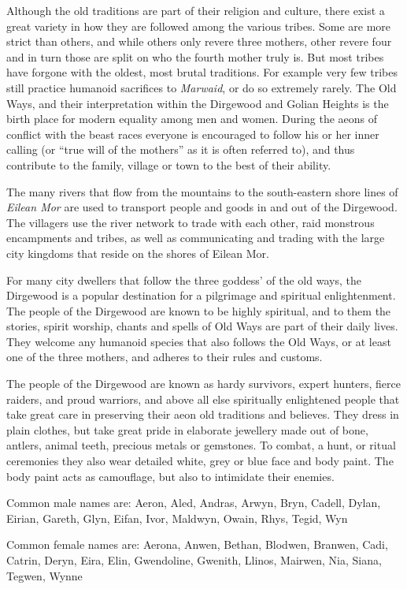 Although the old traditions are part of their religion and culture, there
exist a great variety in how they are followed among the various tribes. Some
are more strict than others, and while others only revere three mothers, other
revere four and in turn those are split on who the fourth mother truly is. But
most tribes have forgone with the oldest, most brutal traditions. For example
very few tribes still practice humanoid sacrifices to \emph{Marwaid}, or do so
extremely rarely. The Old Ways, and their interpretation within the Dirgewood
and Golian Heights is the birth place for modern equality among men and
women. During the aeons of conflict with the beast races everyone is
encouraged to follow his or her inner calling (or ``true will of the mothers''
as it is often referred to), and thus contribute to the family, village or
town to the best of their ability.

The many rivers that flow from the mountains to the south-eastern shore lines of
\emph{Eilean Mor} are used to transport people and goods in and out of the
Dirgewood. The villagers use the river network to trade with each other, raid
monstrous encampments and tribes, as well as communicating and trading with
the large city kingdoms that reside on the shores of Eilean Mor.

For many city dwellers that follow the three goddess' of the old ways, the
Dirgewood is a popular destination for a pilgrimage and spiritual
enlightenment. The people of the Dirgewood are known to be highly spiritual,
and to them the stories, spirit worship, chants and spells of Old Ways are
part of their daily lives. They welcome any humanoid species that also follows
the Old Ways, or at least one of the three mothers, and adheres to their rules
and customs.

The people of the Dirgewood are known as hardy survivors, expert hunters,
fierce raiders, and proud warriors, and above all else spiritually enlightened
people that take great care in preserving their aeon old traditions and
believes. They dress in plain clothes, but take great pride in elaborate
jewellery made out of bone, antlers, animal teeth, precious metals or
gemstones. To combat, a hunt, or ritual ceremonies they also wear detailed
white, grey or blue face and body paint. The body paint acts as camouflage,
but also to intimidate their enemies.

Common male names are: Aeron, Aled, Andras, Arwyn, Bryn, Cadell, Dylan,
Eirian, Gareth, Glyn, Eifan, Ivor, Maldwyn, Owain, Rhys, Tegid, Wyn

Common female names are: Aerona, Anwen, Bethan, Blodwen, Branwen, Cadi,
Catrin, Deryn, Eira, Elin, Gwendoline, Gwenith, Llinos, Mairwen, Nia,
Siana, Tegwen, Wynne
